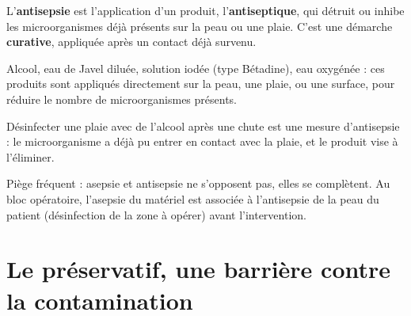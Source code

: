 \begin{definition}[Antisepsie]
L'\textbf{antisepsie} est l'application d'un produit, l'\textbf{antiseptique}, qui
détruit ou inhibe les microorganismes déjà présents sur la peau ou une plaie. C'est
une démarche \textbf{curative}, appliquée après un contact déjà survenu.
\end{definition}

\begin{propriete}
Alcool, eau de Javel diluée, solution iodée (type Bétadine), eau oxygénée : ces
produits sont appliqués directement sur la peau, une plaie, ou une surface, pour
réduire le nombre de microorganismes présents.
\end{propriete}

\begin{illus}
\end{illus}

\begin{exemple}
Désinfecter une plaie avec de l'alcool après une chute est une mesure d'antisepsie :
le microorganisme a déjà pu entrer en contact avec la plaie, et le produit vise à
l'éliminer.
\end{exemple}

\begin{remarque}
Piège fréquent : asepsie et antisepsie ne s'opposent pas, elles se complètent. Au bloc
opératoire, l'asepsie du matériel est associée à l'antisepsie de la peau du patient
(désinfection de la zone à opérer) avant l'intervention.
\end{remarque}

\section{Le préservatif, une barrière contre la contamination}

